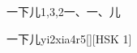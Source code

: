 \begin{entry}{一下儿}{1,3,2}{⼀、⼀、⼉}
  \begin{phonetics}{一下儿}{yi2xia4r5}[][HSK 1]
  \end{phonetics}
\end{entry}
